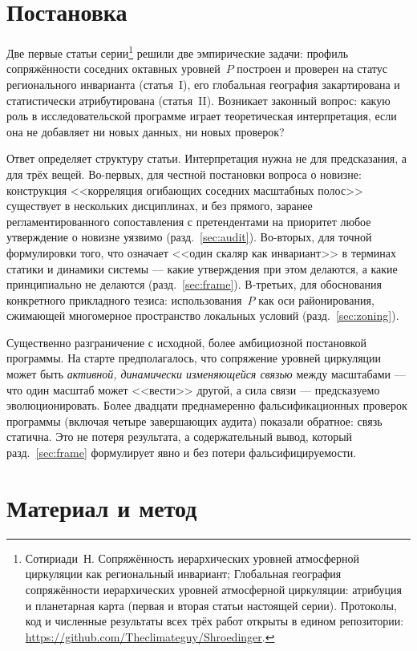\documentclass[11pt,a4paper]{article}
\begin{document}
\section{Постановка}
\label{sec:intro}

Две первые статьи серии\footnote{Сотириади~Н. Сопряжённость иерархических уровней атмосферной циркуляции как региональный инвариант; Глобальная география сопряжённости иерархических уровней атмосферной циркуляции: атрибуция и планетарная карта (первая и вторая статьи настоящей серии). Протоколы, код и численные результаты всех трёх работ открыты в едином репозитории: \url{https://github.com/Theclimateguy/Shroedinger}.} решили две эмпирические задачи: профиль сопряжённости соседних октавных уровней~$P$ построен и проверен на статус регионального инварианта (статья~I), его глобальная география закартирована и статистически атрибутирована (статья~II). Возникает законный вопрос: какую роль в исследовательской программе играет теоретическая интерпретация, если она не добавляет ни новых данных, ни новых проверок?

Ответ определяет структуру статьи. Интерпретация нужна не для предсказания, а для трёх вещей. Во-первых, для честной постановки вопроса о новизне: конструкция <<корреляция огибающих соседних масштабных полос>> существует в нескольких дисциплинах, и без прямого, заранее регламентированного сопоставления с претендентами на приоритет любое утверждение о новизне уязвимо (разд.~\ref{sec:audit}). Во-вторых, для точной формулировки того, что означает <<один скаляр как инвариант>> в терминах статики и динамики системы --- какие утверждения при этом делаются, а какие принципиально не делаются (разд.~\ref{sec:frame}). В-третьих, для обоснования конкретного прикладного тезиса: использования~$P$ как оси районирования, сжимающей многомерное пространство локальных условий (разд.~\ref{sec:zoning}).

Существенно разграничение с исходной, более амбициозной постановкой программы. На старте предполагалось, что сопряжение уровней циркуляции может быть \emph{активной, динамически изменяющейся связью} между масштабами --- что один масштаб может <<вести>> другой, а сила связи --- предсказуемо эволюционировать. Более двадцати преднамеренно фальсификационных проверок программы (включая четыре завершающих аудита) показали обратное: связь статична. Это не потеря результата, а содержательный вывод, который разд.~\ref{sec:frame} формулирует явно и без потери фальсифицируемости.

\section{Материал и метод}
\label{sec:data}
\end{document}
